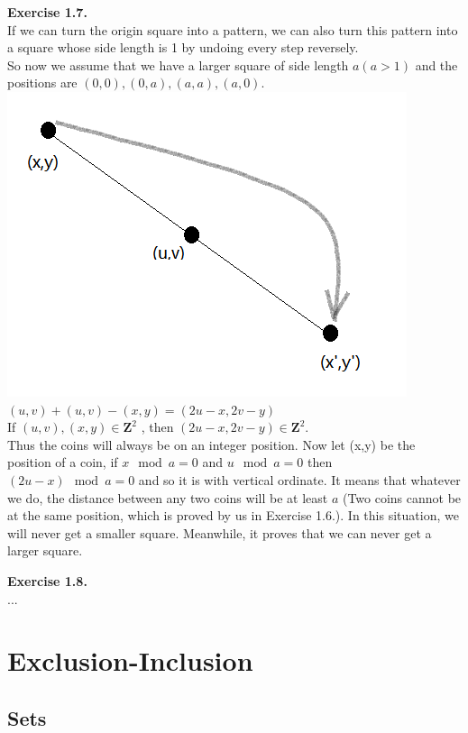 \documentclass{article}
\begin{document}
\begin{flushleft}
\textbf{Exercise 1.7.} \\
If we can turn the origin square into a pattern, we can also turn this pattern
into a square whose side length is 1 by undoing every step reversely. \\
So now we assume that we have a larger square of side length $a(a>1)$ 
and the positions are $(0,0),(0,a),(a,a),(a,0).$\\
\includegraphics[scale=1]{1_5_1.png}\\
$(u,v)+(u,v)-(x,y)=(2u-x,2v-y)$\\
If $(u,v),(x,y)\in\mathbf{Z}^2$ , then $(2u-x,2v-y)\in\mathbf{Z}^2$.\\
Thus the coins will always be on an integer position.
Now let (x,y) be the position of a coin, if $x\mod a=0$ and $u\mod a=0$ then $(2u-x)\mod a=0$
and so it is with vertical ordinate. It means that whatever we do, the distance between any two
coins will be at least $a$ (Two coins cannot be at the same position, which is proved by us in 
Exercise 1.6.). In this situation, we will never get a smaller square. Meanwhile, it proves that 
we can never get a larger square.

\textbf{Exercise 1.8.} \\
...

\end{flushleft}
\section{Exclusion-Inclusion}
\subsection{Sets}
\end{document}
